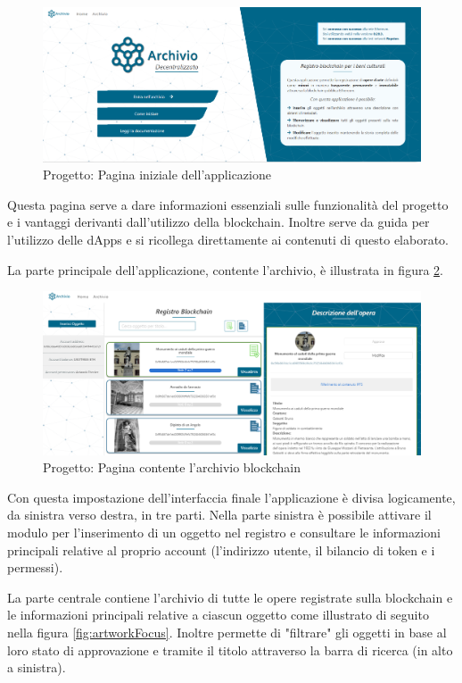 \begin{figure}[H]
\centering
\includegraphics[width=1\textwidth]{immagini/prova3Index.PNG}
\caption{Progetto: Pagina iniziale dell'applicazione}
\label{fig:indexApp}
\end{figure}

Questa pagina serve a dare informazioni essenziali sulle funzionalità del progetto e i vantaggi derivanti dall'utilizzo della blockchain. Inoltre serve da guida per l'utilizzo delle dApps e si ricollega direttamente ai contenuti di questo elaborato.

La parte principale dell'applicazione, contente l'archivio, è illustrata in figura \ref{fig:artworkApp}.

\begin{figure}[H]
\centering
\includegraphics[width=1\textwidth]{immagini/artwork3Prova.PNG}
\caption{Progetto: Pagina contente l'archivio blockchain}
\label{fig:artworkApp}
\end{figure}

Con questa impostazione dell'interfaccia finale l'applicazione è divisa logicamente, da sinistra verso destra, in tre parti. Nella parte sinistra è possibile attivare il modulo per l'inserimento di un oggetto nel registro e consultare le informazioni principali relative al proprio account (l'indirizzo utente, il bilancio di token e i permessi). 

La parte centrale contiene l'archivio di tutte le opere registrate sulla blockchain e le informazioni principali relative a ciascun oggetto come illustrato di seguito nella figura \ref{fig:artworkFocus}. Inoltre permette di "filtrare" gli oggetti in base al loro stato di approvazione e tramite il titolo attraverso la barra di ricerca (in alto a sinistra).

